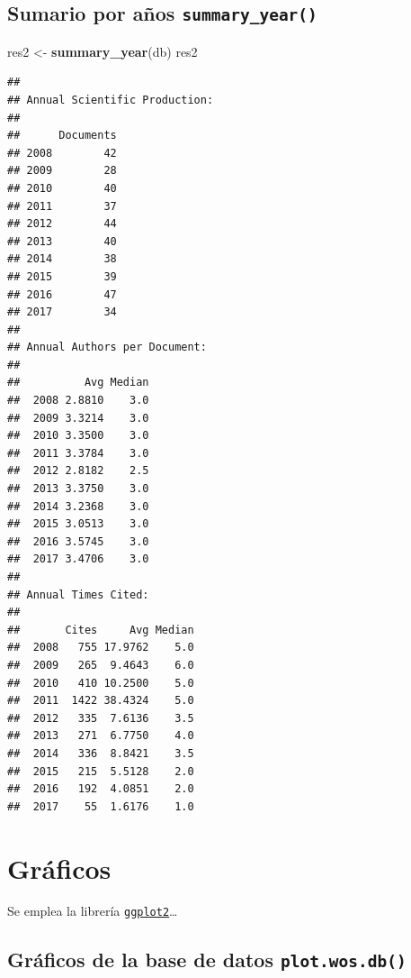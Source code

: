 \documentclass[]{book}
\newenvironment{Shaded}{\begin{snugshade}}{\end{snugshade}}
\newcommand{\KeywordTok}[1]{\textcolor[rgb]{0.13,0.29,0.53}{\textbf{#1}}}
\newcommand{\NormalTok}[1]{#1}
\newcommand{\StringTok}[1]{\textcolor[rgb]{0.31,0.60,0.02}{#1}}
\begin{document}
\hypertarget{sumario-por-anos-summary_year}{%
\subsection{\texorpdfstring{Sumario por años \texttt{summary\_year()}}{Sumario por años summary\_year()}}\label{sumario-por-anos-summary_year}}

\begin{Shaded}
\begin{Highlighting}[]
\NormalTok{res2 <-}\StringTok{ }\KeywordTok{summary_year}\NormalTok{(db)}
\NormalTok{res2}
\end{Highlighting}
\end{Shaded}

\begin{verbatim}
## 
## Annual Scientific Production:
## 
##      Documents
## 2008        42
## 2009        28
## 2010        40
## 2011        37
## 2012        44
## 2013        40
## 2014        38
## 2015        39
## 2016        47
## 2017        34
## 
## Annual Authors per Document:
## 
##          Avg Median
##  2008 2.8810    3.0
##  2009 3.3214    3.0
##  2010 3.3500    3.0
##  2011 3.3784    3.0
##  2012 2.8182    2.5
##  2013 3.3750    3.0
##  2014 3.2368    3.0
##  2015 3.0513    3.0
##  2016 3.5745    3.0
##  2017 3.4706    3.0
## 
## Annual Times Cited:
## 
##       Cites     Avg Median
##  2008   755 17.9762    5.0
##  2009   265  9.4643    6.0
##  2010   410 10.2500    5.0
##  2011  1422 38.4324    5.0
##  2012   335  7.6136    3.5
##  2013   271  6.7750    4.0
##  2014   336  8.8421    3.5
##  2015   215  5.5128    2.0
##  2016   192  4.0851    2.0
##  2017    55  1.6176    1.0
\end{verbatim}

\hypertarget{graficos}{%
\section{Gráficos}\label{graficos}}

Se emplea la librería \href{https://ggplot2.tidyverse.org}{\texttt{ggplot2}}\ldots{}

\hypertarget{graficos-de-la-base-de-datos-plot.wos.db}{%
\subsection{\texorpdfstring{Gráficos de la base de datos \texttt{plot.wos.db()}}{Gráficos de la base de datos plot.wos.db()}}\label{graficos-de-la-base-de-datos-plot.wos.db}}
\end{document}
